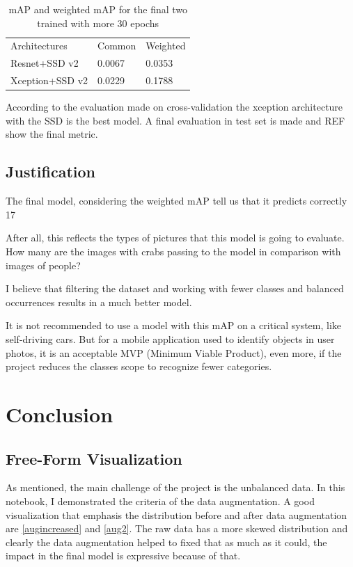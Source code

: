 \documentclass[11pt, a4paper, twocolumn]{article}
\begin{document}
\begin{table}[!ht]
	\begin{tabular}{lll}
		\rowcolor[HTML]{EFEFEF} 
		Architectures & Common & Weighted \\
		Resnet+SSD v2 & 0.0067 & 0.0353   \\
		\rowcolor[HTML]{EFEFEF} 
		Xception+SSD v2 & 0.0229 & 0.1788
		\label{crossval2}
	\end{tabular}
	\caption{mAP and weighted mAP for the final two trained with more 30 epochs}
\end{table}

According to the evaluation made on cross-validation the xception architecture with the SSD is the best model. A final evaluation in test set is made and REF show the final metric.

\subsection{Justification}

The final model, considering the weighted mAP tell us that it predicts correctly 17%

After all, this reflects the types of pictures that this model is going to evaluate. How many are the images with crabs passing to the model in comparison with images of people?

I believe that filtering the dataset and working with fewer classes and balanced occurrences results in a much better model.

It is not recommended to use a model with this mAP on a critical system, like self-driving cars. But for a mobile application used to identify objects in user photos, it is an acceptable MVP (Minimum Viable Product), even more, if the project reduces the classes scope to recognize fewer categories.

\section{Conclusion}
\subsection{Free-Form Visualization}

As mentioned, the main challenge of the project is the unbalanced data. In this notebook, I demonstrated the criteria of the data augmentation. A good visualization that emphasis the distribution before and after data augmentation are \ref{augincreased} and \ref{aug2}. The raw data has a more skewed distribution and clearly the data augmentation helped to fixed that as much as it could, the impact in the final model is expressive because of that.
\end{document}
